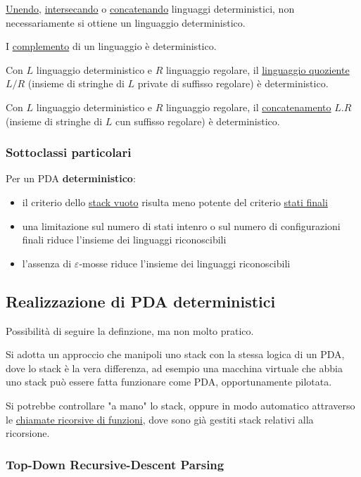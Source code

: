 \underline{Unendo}, \underline{intersecando} o \underline{concatenando} linguaggi deterministici,  non necessariamente si ottiene un linguaggio deterministico.

I \underline{complemento} di un linguaggio è deterministico.

Con $L$ linguaggio deterministico e $R$ linguaggio regolare, il \underline{linguaggio quoziente}  $L/R$ (insieme di stringhe di $L$ private di suffisso regolare) è deterministico.

Con $L$ linguaggio deterministico e $R$ linguaggio regolare, il \underline{concatenamento} $L.R$ (insieme di stringhe di $L$ cun suffisso regolare) è deterministico.

\subsubsection{Sottoclassi particolari}
Per un PDA \textbf{deterministico}:
\begin{itemize}
    \item il criterio dello \underline{stack vuoto} risulta meno potente del criterio \underline{stati finali}
    \item una limitazione sul numero di stati intenro o sul numero di configurazioni finali riduce l'insieme dei linguaggi riconoscibili
    \item l'assenza di $\varepsilon$-mosse riduce l'insieme dei linguaggi riconoscibili
\end{itemize}


\subsection{Realizzazione di PDA deterministici}
Possibilità di seguire la definzione, ma non molto pratico.

Si adotta un approccio che manipoli uno stack con la stessa logica di un PDA, dove lo stack è la vera differenza, ad esempio una macchina virtuale che abbia uno stack può essere fatta funzionare come PDA, opportunamente pilotata.

Si potrebbe controllare "a mano" lo stack, oppure in modo automatico attraverso le \underline{chiamate ricorsive di funzioni}, dove sono già gestiti stack relativi alla ricorsione.

\subsubsection{Top-Down Recursive-Descent Parsing}

